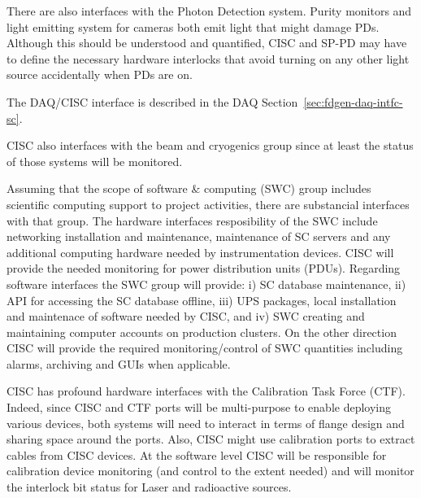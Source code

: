 There are also interfaces with the Photon Detection system. Purity monitors and light emitting system for cameras both emit light that might damage PDs.
Although this should be understood and quantified, CISC and SP-PD may have to define the necessary hardware interlocks
that avoid turning on any other light source accidentally when PDs are on.

The DAQ/CISC interface is described in the DAQ Section~\ref{sec:fdgen-daq-intfc-sc}. 





CISC also interfaces with the beam and cryogenics group since at least the status of those systems will be monitored.



Assuming that the scope of software \& computing (SWC) group includes scientific computing support to project activities, there are substancial interfaces with that group. 
The hardware interfaces resposibility of the SWC include networking installation and maintenance,
maintenance of SC servers and any additional computing hardware needed by instrumentation devices.
CISC will provide the needed monitoring for power distribution units (PDUs). Regarding software interfaces the SWC group will provide:
i) SC database maintenance, ii) API for accessing the SC database offline,
iii) UPS packages, local installation and maintenace of software needed by CISC, and iv) SWC creating and maintaining computer accounts on production clusters. 
On the other direction CISC will provide the required monitoring/control of SWC quantities including alarms, archiving and GUIs when applicable. 


CISC has profound hardware interfaces with the Calibration Task Force (CTF). Indeed, since CISC and CTF ports will be multi-purpose to enable deploying various devices,
both systems will need to interact in terms of flange design and sharing space around the ports. Also, CISC might use calibration ports to extract cables from CISC devices. 
At the software level CISC will be responsible for calibration device monitoring (and control to the extent needed) and will 
monitor the interlock bit status for Laser and radioactive sources. 

